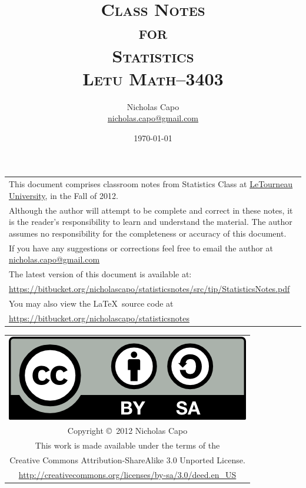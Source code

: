\documentclass{book}
\title{\textsc{Class Notes\\ for \\ Statistics\\ Letu Math--3403}}
\author{Nicholas Capo\\ \href{mailto:nicholas.capo@gmail.com}{nicholas.capo@gmail.com}}
\date{\today\\ \currenttime}
\begin{document}
\maketitle

\section*{}
\begin{tabular}{p{}}
This document comprises classroom notes from {Statistics Class} at \href{letu.edu}{LeTourneau University}, in the Fall of 2012.\\

\vspace{5pt}

Although the author will attempt to be complete and correct in these notes, it is the reader's responsibility to learn and understand the material. The author assumes no responsibility for the completeness or accuracy of this document. \\

\vspace{20pt}

If you have any suggestions  or corrections feel free to email the author at \href{mailto:nicholas.capo@gmail.com}{nicholas.capo@gmail.com}\\

\vspace{5pt}

The latest version of this document is available at:\\ \url{https://bitbucket.org/nicholascapo/statisticsnotes/src/tip/StatisticsNotes.pdf}\\

\vspace{5pt}

You may also view the \LaTeX\ source code at\\
\url{https://bitbucket.org/nicholascapo/statisticsnotes}\\
\end{tabular}

\vfill

\begin{tabular}{c}
\href{http://creativecommons.org/licenses/by-sa/3.0}{\includegraphics[width=.25\textwidth]{by-sa.png}}\\
Copyright \copyright\ 2012 Nicholas Capo\\
This work is made available under the terms of the\\
Creative Commons Attribution-ShareAlike 3.0 Unported License.\\
\url{http://creativecommons.org/licenses/by-sa/3.0/deed.en_US}\\
\end{tabular}
\end{document}
